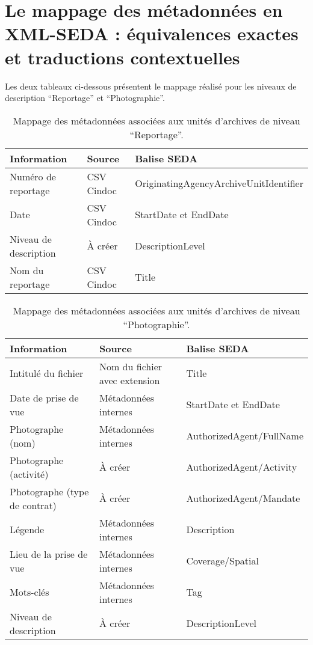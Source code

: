 \section{Le mappage des métadonnées en XML-SEDA : équivalences exactes et traductions contextuelles}

Les deux tableaux ci-dessous présentent le mappage réalisé pour les niveaux de description \enquote{Reportage} et \enquote{Photographie}.

\begin{table}[h]
	\centering
	\begin{tabularx}{\textwidth}{|m{4cm}|m{3.5cm}|m{7.2cm}|}
		\hline
		\rowcolor{pastelblue-dark} 
		\textbf{Information} & \textbf{Source} & \textbf{Balise SEDA} \\
		\hline
		\rowcolor{pastelblue}
		Numéro de reportage & CSV Cindoc & OriginatingAgencyArchiveUnitIdentifier \\
		\hline
		\rowcolor{pastelblue}
		Date & CSV Cindoc & StartDate et EndDate \\
		\hline
		\rowcolor{pastelblue}
		Niveau de description & À créer & DescriptionLevel \\
		\hline
		\rowcolor{pastelblue}
		Nom du reportage & CSV Cindoc & Title \\
		\hline
	\end{tabularx}
	\caption{Mappage des métadonnées associées aux unités d'archives de niveau \enquote{Reportage}.}
\end{table}

\begin{table}[h]
	\centering
	\begin{tabularx}{\textwidth}{|m{4cm}|m{4cm}|X|}
		\hline
		\rowcolor{pastelblue-dark} 
		\textbf{Information} & \textbf{Source} & \textbf{Balise SEDA} \\
		\hline
		\rowcolor{pastelblue}
		Intitulé du fichier & Nom du fichier avec extension & Title \\
		\hline
		\rowcolor{pastelblue}
		Date de prise de vue & Métadonnées internes & StartDate et EndDate \\
		\hline
		\rowcolor{pastelblue}
		Photographe (nom) & Métadonnées internes & AuthorizedAgent/FullName \\
		\hline
		\rowcolor{pastelblue}
		Photographe (activité) & À créer & AuthorizedAgent/Activity \\
		\hline
		\rowcolor{pastelblue}
		Photographe (type de contrat) & À créer & AuthorizedAgent/Mandate \\
		\hline
		\rowcolor{pastelblue}
		Légende & Métadonnées internes & Description \\
		\hline
		\rowcolor{pastelblue}
		Lieu de la prise de vue & Métadonnées internes & Coverage/Spatial \\
		\hline
		\rowcolor{pastelblue}
		Mots-clés & Métadonnées internes & Tag \\
		\hline
		\rowcolor{pastelblue}
		Niveau de description & À créer & DescriptionLevel \\
		\hline
	\end{tabularx}
	\caption{Mappage des métadonnées associées aux unités d'archives de niveau \enquote{Photographie}.}
\end{table}

